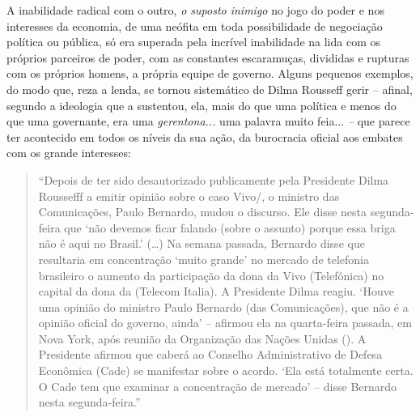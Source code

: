 A inabilidade radical com o outro, \emph{o suposto inimigo} no jogo do
poder e nos interesses da economia, de uma neófita em toda possibilidade
de negociação política ou pública, só era superada pela incrível
inabilidade na lida com os próprios parceiros de poder, com as
constantes escaramuças, divididas e rupturas com os próprios homens, a
própria equipe de governo. Alguns pequenos exemplos, do modo que, reza a
lenda, se tornou sistemático de Dilma Rousseff gerir -- afinal, segundo
a ideologia que a sustentou, ela, mais do que uma política e menos do
que uma governante, era uma \emph{gerentona...} uma palavra muito
feia... \emph{--} que parece ter acontecido em todos os níveis da sua
ação, da burocracia oficial aos embates com os grande interesses:



\begin{quote}
``Depois de ter
sido {desautorizado
publicamente pela Presidente Dilma Roussefff a emitir opinião sobre o
caso Vivo/}, o ministro das Comunicações, Paulo Bernardo, mudou o
discurso. Ele disse nesta segunda-feira que `não devemos ficar falando
(sobre o assunto) porque essa briga não é aqui no Brasil.' (…) Na
semana passada, Bernardo disse que resultaria em concentração `muito
grande' no mercado de telefonia brasileiro o aumento da participação da
dona da Vivo (Telefônica) no capital da dona da  (Telecom Italia). A
Presidente Dilma reagiu. `Houve uma opinião do ministro Paulo Bernardo
(das Comunicações), que não é a opinião oficial do governo, ainda' --
afirmou ela na quarta-feira passada, em Nova York, após reunião da
Organização das Nações Unidas (). A Presidente afirmou que caberá ao
Conselho Administrativo de Defesa Econômica (Cade) se manifestar sobre o
acordo. `Ela está totalmente certa. O Cade tem que examinar a
concentração de mercado' -- disse Bernardo nesta segunda-feira.''
\end{quote}

\asterisc



